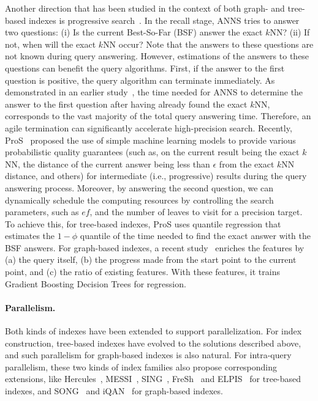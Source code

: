 \documentclass[11pt]{article}
\begin{document}
Another direction that has been studied in the context of both graph- and tree-based indexes is progressive search~\cite{pros,panene,early-termination,leqat}.
In the recall stage, ANNS tries to answer two questions:
(i) Is the current Best-So-Far (BSF) answer the exact $k$NN?
(ii) If not, when will the exact $k$NN occur?
Note that the answers to these questions are not known during query answering. 
However, estimations of the answers to these questions can benefit the query algorithms.
First, if the answer to the first question is positive, the query algorithm can terminate immediately.
As demonstrated in an earlier study~\cite{pros}, the time needed for ANNS to determine the answer to the first question after having already found the exact $k$NN, corresponds to the vast majority of the total query answering time.
Therefore, an agile termination can significantly accelerate high-precision search.
Recently, ProS~\cite{pros} proposed the use of simple machine learning models to provide various probabilistic quality guarantees (such as, on the current result being the exact $k$NN, the distance of the current answer being less than $\epsilon$ from the exact $k$NN distance, and others) for intermediate (i.e., progressive) results during the query answering process.
Moreover, by answering the second question, we can dynamically schedule the computing resources by controlling the search parameters, such as $ef$, and the number of leaves to visit for a precision target.
To achieve this, for tree-based indexes, ProS uses quantile regression that estimates the $1-\phi$ quantile of the time needed to find the exact answer with the BSF answers.
For graph-based indexes, a recent study~\cite{early-termination} enriches the features by (a) the query itself, (b) the progress made from the start point to the current point, and (c) the ratio of existing features.
With these features, it trains Gradient Boosting Decision Trees for regression.


\paragraph{Parallelism.}
Both kinds of indexes have been extended to support parallelization.
For index construction, tree-based indexes have evolved to the solutions described above, and such parallelism for graph-based indexes is also natural.
For intra-query parallelism, these two kinds of index families also propose corresponding extensions, like Hercules~\cite{hercules}, MESSI~\cite{messi}, SING~\cite{sing}, FreSh~\cite{fresh} and ELPIS~\cite{elpis} for tree-based indexes, and SONG~\cite{song} and iQAN~\cite{iqan} for graph-based indexes.
\end{document}
